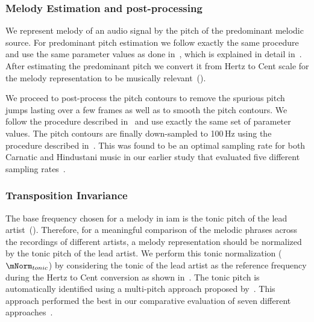 \subsubsection{Melody Estimation and post-processing}
\label{sec:patterns_improving_similarity_melody_estimation}

We represent melody of an audio signal by the pitch of the predominant melodic source. For predominant pitch estimation we follow exactly the same procedure and use the same parameter values as done in~, which is explained in detail in~. After estimating the predominant pitch we convert it from Hertz to Cent scale for the melody representation to be musically relevant~().

We proceed to post-process the pitch contours to remove the spurious pitch jumps lasting over a few frames as well as to smooth the pitch contours. We follow the procedure described in~ and use exactly the same set of parameter values. The pitch contours are finally down-sampled to 100\,Hz using the procedure described in~. This was found to be an optimal sampling rate for both Carnatic and Hindustani music in our earlier study that evaluated five different sampling rates~. 


\subsubsection{Transposition Invariance}
\label{sec:patterns_improving_similarity_transposition_invariance}

The base frequency chosen for a melody in \gls{iam} is the tonic pitch of the lead artist~(). Therefore, for a meaningful comparison of the melodic phrases across the recordings of different artists, a melody representation should be normalized by the tonic pitch of the lead artist. We perform this tonic normalization ($\mNorm_{tonic}$) by considering the tonic of the lead artist as the reference frequency during the Hertz to Cent conversion as shown in~. The tonic pitch is automatically identified using a multi-pitch approach proposed by~\cite{salamon2012multipitch}. This approach performed the best in our comparative evaluation of seven different approaches~.

